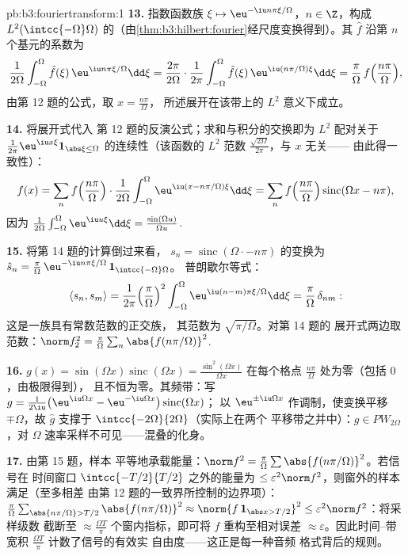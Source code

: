 \begin{solution}{pb:b3:fouriertransform:1}
\textbf{13.} 指数函数族 $\xi \mapsto \eu^{-\iu
n\pi\xi/\Omega}$，$n \in \Z$，构成
$L^2(\intcc{-\Omega}\Omega)$
的（由\cref{thm:b3:hilbert:fourier}经尺度变换得到）。其
$\hat f$ 沿第 $n$ 个基元的系数为
\[
\frac1{2\Omega}\int_{-\Omega}^\Omega\hat f(\xi)\,
\eu^{\iu n\pi\xi/\Omega}\dd\xi
= \frac{2\pi}{2\Omega}\cdot
\frac1{2\pi}\int_{-\Omega}^{\Omega}\hat f(\xi)\,
\eu^{\iu(n\pi/\Omega)\xi}\dd\xi
= \frac\pi\Omega\,f\Bigl(\frac{n\pi}\Omega\Bigr),
\]
由第 12 题的公式，取 $x = \frac{n\pi}\Omega$，
所述展开在该带上的 $L^2$ 意义下成立。

\textbf{14.} 将展开式代入
第 12 题的反演公式；求和与积分的交换即为
$L^2$ 配对关于 $\frac1{2\pi}
\eu^{\iu x\xi}\mathbf 1_{\abs\xi\leq\Omega}$ 的连续性（该函数的 $L^2$
范数 $\frac{\sqrt{2\Omega}}{2\pi}$，与 $x$ 无关——
由此得一致性）：
\[
f(x) = \sum_nf\Bigl(\frac{n\pi}\Omega\Bigr)\cdot
\frac1{2\Omega}\int_{-\Omega}^\Omega
\eu^{\iu(x - n\pi/\Omega)\xi}\dd\xi
= \sum_nf\Bigl(\frac{n\pi}\Omega\Bigr)
\operatorname{sinc}(\Omega x - n\pi),
\]
因为 $\frac1{2\Omega}\int_{-\Omega}^\Omega\eu^{\iu
u\xi}\dd\xi = \frac{\sin(\Omega u)}{\Omega u}$.

\textbf{15.} 将第 14 题的计算倒过来看，
$s_n = \operatorname{sinc}(\Omega\cdot -
n\pi)$ 的变换为 $\hat s_n = \frac\pi\Omega\,\eu^{-\iu
n\pi\xi/\Omega}\,\mathbf 1_{\intcc{-\Omega}\Omega}$。
普朗歇尔等式：
\[
\langle s_n, s_m\rangle = \frac1{2\pi}
\Bigl(\frac\pi\Omega\Bigr)^2\int_{-\Omega}^\Omega
\eu^{\iu(n-m)\pi\xi/\Omega}\dd\xi =
\frac\pi\Omega\,\delta_{nm} :
\]
这是一族具有常数范数的正交族，
其范数为 $\sqrt{\pi/\Omega}$。对第 14 题的
展开式两边取范数：$\norm f_2^2 =
\frac\pi\Omega\sum_n\abs{f(n\pi/\Omega)}^2$.

\textbf{16.} $g(x) = \sin(\Omega x)\operatorname{sinc}
(\Omega x) = \frac{\sin^2(\Omega x)}{\Omega x}$ 在每个格点
$\frac{n\pi}\Omega$ 处为零（包括 $0$，由极限得到），
且不恒为零。其频带：写 $g =
\frac1{2\iu}\bigl(\eu^{\iu\Omega x} - \eu^{-\iu\Omega
x}\bigr)\operatorname{sinc}(\Omega x)$；
以 $\eu^{\pm\iu\Omega x}$ 作调制，使变换平移
$\mp\Omega$，故 $\hat g$ 支撑于
$\intcc{-2\Omega}{2\Omega}$（实际上在两个
平移带之并中）：$g \in PW_{2\Omega}$，对
$\Omega$ 速率采样不可见——混叠的化身。

\textbf{17.} 由第 15 题，样本
平等地承载能量：$\norm f^2 = \frac\pi\Omega\sum
\abs{f(n\pi/\Omega)}^2$。若信号在
时间窗口 $\intcc{-T/2}{T/2}$ 之外的能量为 $\leq \varepsilon^2\norm
f^2$，则窗外的样本满足（至多相差
由第 12 题的一致界所控制的边界项）：
$\frac\pi\Omega\sum_{\abs{n\pi/\Omega} > T/2}
\abs{f(n\pi/\Omega)}^2 \approx \norm{f\,\mathbf 1_{\abs x >
T/2}}^2 \leq \varepsilon^2\norm f^2$：将采样级数
截断至 $\approx \frac{\Omega T}\pi$
个窗内指标，即可将 $f$ 重构至相对误差
$\approx\varepsilon$。因此时间--带宽积
$\frac{\Omega T}{\pi}$ 计数了信号的有效实
自由度——这正是每一种音频
格式背后的规则。


\end{solution}
